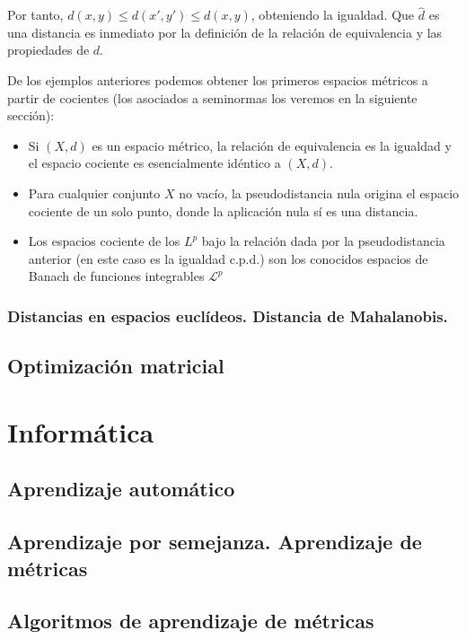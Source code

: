 \documentclass[ oneside,openany,titlepage,numbers=noenddot,headinclude,%
                footinclude=true,cleardoublepage=empty,abstractoff, %
                BCOR=5mm,paper=a4,fontsize=11pt,%
                spanish,american%
                ]{scrreprt}
\begin{document}
Por tanto, $d(x,y) \le d(x',y') \le d(x,y)$, obteniendo la igualdad. Que $\hat{d}$ es una distancia es inmediato por la definición de la relación de equivalencia y las propiedades de $d$.

\proofe

De los ejemplos anteriores podemos obtener los primeros espacios métricos a partir de cocientes (los asociados a seminormas los veremos en la siguiente sección):

\begin{itemize}
	\item Si $(X,d)$ es un espacio métrico, la relación de equivalencia es la igualdad y el espacio cociente es esencialmente idéntico a $(X,d)$.
	\item Para cualquier conjunto $X$ no vacío, la pseudodistancia nula origina el espacio cociente de un solo punto, donde la aplicación nula sí es una distancia.
	\item Los espacios cociente de los $L^p$ bajo la relación dada por la pseudodistancia anterior (en este caso es la igualdad c.p.d.) son los conocidos espacios de Banach de funciones integrables $\mathcal{L}^p$
\end{itemize}
 
\section{Distancias en espacios euclídeos. Distancia de Mahalanobis.}




\chapter{Optimización matricial}


\part{Informática}

\chapter{Aprendizaje automático}\label{ch:learning}


\chapter{Aprendizaje por semejanza. Aprendizaje de métricas}\label{ch:sim}

\chapter{Algoritmos de aprendizaje de métricas}
\end{document}
